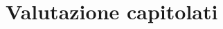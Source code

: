  \pagebreak
\section{Valutazione capitolati}\label{sec:Valutazione capitolati}
 \pagebreak
 \pagebreak
 \pagebreak
 \pagebreak
 \pagebreak
 \pagebreak
 \pagebreak